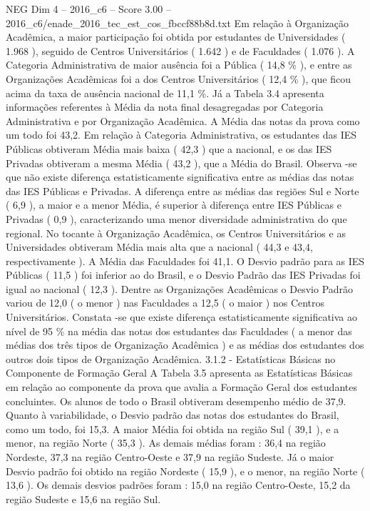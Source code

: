 \begin{textsample}{NEG Dim 4 – 2016\_c6 – Score 3.00 – 2016\_c6/enade\_2016\_tec\_est\_cos\_fbccf88b8d.txt}
Em relação à Organização Acadêmica, a maior participação foi obtida por estudantes de Universidades ( 1.968 ), seguido de Centros Universitários ( 1.642 ) e de Faculdades ( 1.076 ).
A Categoria Administrativa de maior ausência foi a Pública ( 14,8 \% ), e entre as Organizações Acadêmicas foi a dos Centros Universitários ( 12,4 \% ), que ficou acima da taxa de ausência nacional de 11,1 \%.
Já a Tabela 3.4 apresenta informações referentes à Média da nota final desagregadas por Categoria Administrativa e por Organização Acadêmica.
A Média das notas da prova como um todo foi 43,2.
Em relação à Categoria Administrativa, os estudantes das IES Públicas obtiveram Média mais baixa ( 42,3 ) que a nacional, e os das IES Privadas obtiveram a mesma Média ( 43,2 ), que a Média do Brasil.
Observa -se que não existe diferença estatisticamente significativa entre as médias das notas das IES Públicas e Privadas.
A diferença entre as médias das regiões Sul e Norte ( 6,9 ), a maior e a menor Média, é superior à diferença entre IES Públicas e Privadas ( 0,9 ), caracterizando uma menor diversidade administrativa do que regional.
No tocante à Organização Acadêmica, os Centros Universitários e as Universidades obtiveram Média mais alta que a nacional ( 44,3 e 43,4, respectivamente ).
A Média das Faculdades foi 41,1.
O Desvio padrão para as IES Públicas ( 11,5 ) foi inferior ao do Brasil, e o Desvio Padrão das IES Privadas foi igual ao nacional ( 12,3 ).
Dentre as Organizações Acadêmicas o Desvio Padrão variou de 12,0 ( o menor ) nas Faculdades a 12,5 ( o maior ) nos Centros Universitários.
Constata -se que existe diferença estatisticamente significativa ao nível de 95 \% na média das notas dos estudantes das Faculdades ( a menor das médias dos três tipos de Organização Acadêmica ) e as médias dos estudantes dos outros dois tipos de Organização Acadêmica. 3.1.2 - Estatísticas Básicas no Componente de Formação Geral A Tabela 3.5 apresenta as Estatísticas Básicas em relação ao componente da prova que avalia a Formação Geral dos estudantes concluintes.
Os alunos de todo o Brasil obtiveram desempenho médio de 37,9.
Quanto à variabilidade, o Desvio padrão das notas dos estudantes do Brasil, como um todo, foi 15,3.
A maior Média foi obtida na região Sul ( 39,1 ), e a menor, na região Norte ( 35,3 ).
As demais médias foram : 36,4 na região Nordeste, 37,3 na região Centro-Oeste e 37,9 na região Sudeste.
Já o maior Desvio padrão foi obtido na região Nordeste ( 15,9 ), e o menor, na região Norte ( 13,6 ).
Os demais desvios padrões foram : 15,0 na região Centro-Oeste, 15,2 da região Sudeste e 15,6 na região Sul.

\end{textsample}
